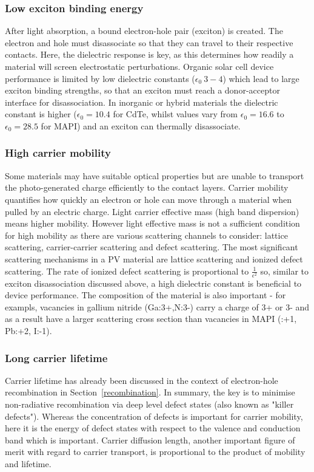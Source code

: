 \subsubsection{Low exciton binding energy}
After light absorption, a bound electron-hole pair (exciton) is created. The electron and hole must disassociate so that they can travel to their respective contacts. Here, the dielectric response is key, as this determines how readily a material will screen electrostatic perturbations. Organic solar cell device performance is limited by low dielectric constants ($\epsilon_0 ~ 3-4$) which lead to large exciton binding strengths, so that an exciton must reach a donor-acceptor interface for disassociation.\autocite{Brebels2017} In inorganic or hybrid materials the dielectric constant is higher ($\epsilon_0=10.4$ for CdTe,\autocite{Madelung2004} whilst values vary from $\epsilon_0=16.6$ to $\epsilon_0=28.5$ for MAPI\autocite{Wilson2019}) and an exciton can thermally disassociate.

\subsubsection{High carrier mobility}
Some materials may have suitable optical properties but are unable to transport the photo-generated charge efficiently to the contact layers. Carrier mobility quantifies how quickly an electron or hole can move through a material when pulled by an electric charge. 
Light carrier effective mass (high band dispersion) means higher mobility. However light effective mass is not a sufficient condition for high mobility as there are various scattering channels to consider: lattice scattering, carrier-carrier scattering and defect scattering. The most significant scattering mechanisms in a PV material are lattice scattering and ionized defect scattering.
The rate of ionized defect scattering is proportional to $\frac{1}{\epsilon^2}$ so, similar to exciton disassociation discussed above, a high dielectric constant is beneficial to device performance. The composition of the material is also important - for exampls, vacancies in gallium nitride (Ga:3+,N:3-) carry a charge of 3+ or 3- and as a result have a larger scattering cross section than vacancies in MAPI (:+1, Pb:+2, I:-1).

\subsubsection{Long carrier lifetime}
Carrier lifetime has already been discussed in the context of electron-hole recombination in Section\ \ref{recombination}. In summary, the key is to minimise non-radiative recombination via deep level defect states (also known as "killer defects"). Whereas the concentration of defects is important for carrier mobility, here it is the energy of defect states with respect to the valence and conduction band which is important. Carrier diffusion length, another important figure of merit with regard to carrier transport, is proportional to the product of mobility and lifetime.

